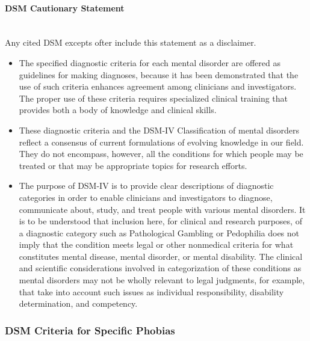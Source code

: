 \documentclass[a4paper,10pt]{article}
\begin{document}
\paragraph{DSM Cautionary Statement}  ~\\
Any cited DSM excepts ofter include this statement as a disclaimer. \cite{dsmCaution}
\begin{itemize}

\item The specified diagnostic criteria for each mental disorder are offered as guidelines for making diagnoses, because it has been demonstrated that 
the use of such criteria enhances agreement among clinicians and investigators. The proper use of these criteria requires specialized clinical
training that provides both a body of knowledge and clinical skills. 

\item These diagnostic criteria and the DSM-IV Classification of mental disorders reflect a consensus of current formulations of evolving knowledge in
our field. They do not encompass, however, all the conditions for which people may be treated or that may be appropriate topics for research efforts. 

\item The purpose of DSM-IV is to provide clear descriptions of diagnostic categories in order to enable clinicians and investigators to diagnose, communicate
about, study, and treat people with various mental disorders. It is to be understood that inclusion here, for clinical and research purposes, of a diagnostic
category such as Pathological Gambling or Pedophilia does not imply that the condition meets legal or other nonmedical criteria for what constitutes mental disease,
mental disorder, or mental disability. The clinical and scientific considerations involved in categorization of these conditions as mental disorders may not be wholly 
relevant to legal judgments, for example, that take into account such issues as individual responsibility, disability determination, and competency.
\end{itemize}
\pagebreak
\subsubsection{DSM Criteria for Specific Phobias}
\end{document}
